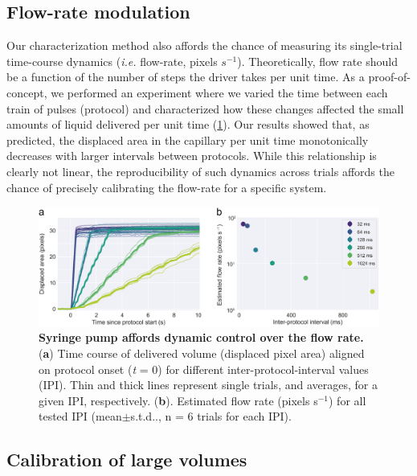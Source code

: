 \subsection*{Flow-rate modulation}
Our characterization method also affords the chance of measuring its single-trial time-course dynamics (\textit{i.e.} flow-rate, pixels $s^{-1}$). Theoretically, flow rate should be a function of the number of steps the driver takes per unit time. As a proof-of-concept, we performed an experiment where we varied the time between each train of pulses (protocol) and characterized how these changes affected the small amounts of liquid delivered per unit time (\cref{fig:FlowRateControl}). Our results showed that, as predicted, the displaced area in the capillary per unit time monotonically decreases with larger intervals between protocols. While this relationship is clearly not linear, the reproducibility of such dynamics across trials affords the chance of precisely calibrating the flow-rate for a specific system.

\begin{figure}
	\centering
	\includegraphics[width=1.0\linewidth]{Figures/Artboard 3.pdf}
	\caption{\textbf{Syringe pump affords dynamic control over the flow rate.}\\
		(\textbf{a}) Time course of delivered volume (displaced pixel area) aligned on protocol onset (\textit{t} = 0) for different inter-protocol-interval values (IPI). Thin and thick lines represent single trials, and averages, for a given IPI, respectively. (\textbf{b}). Estimated flow rate (pixels s$^{-1}$) for all tested IPI (mean$\pm$s.t.d.., n = 6 trials for each IPI).}
	\label{fig:FlowRateControl} 
\end{figure}

\subsection*{Calibration of large volumes} 


